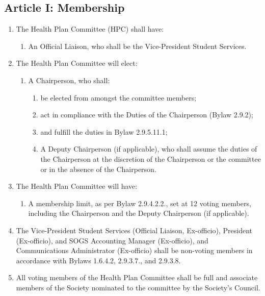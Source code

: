 \subsection{Article I: Membership}
\begin{enumerate}[label*=\arabic*., align=left]	
\item The Health Plan Committee (HPC) shall have:
\begin{enumerate}[label*=\arabic*., align=left]	
\item An Official Liaison, who shall be the Vice-President Student Services. 
\end{enumerate}
\item The Health Plan Committee will elect:
\begin{enumerate}[label*=\arabic*., align=left]
\item A Chairperson, who shall:
\begin{enumerate}[label*=\arabic*., align=left]
\item be elected from amongst the committee members;
\item act in compliance with the Duties of the Chairperson (Bylaw 2.9.2);
\item and fulfill the duties in Bylaw 2.9.5.11.1;
\item A Deputy Chairperson (if applicable), who shall assume the duties of the Chairperson at the discretion of the Chairperson or the committee or in the absence of the Chairperson.
\end{enumerate}
\end{enumerate}
\item The Health Plan Committee will have:
\begin{enumerate}[label*=\arabic*., align=left]
\item A membership limit, as per Bylaw 2.9.4.2.2., set at 12 voting members, including the Chairperson and the Deputy Chairperson (if applicable).
\end{enumerate}
\item The Vice-President Student Services (Official Liaison, Ex-officio), President (Ex-officio), and SOGS Accounting Manager (Ex-officio), and Communications Administrator (Ex-officio) shall be non-voting members in accordance with Bylaws 1.6.4.2, 2.9.3.7., and 2.9.3.8.
\item All voting members of the Health Plan Committee shall be full and associate members of the Society nominated to the committee by the Society’s Council.    
\end{enumerate}

